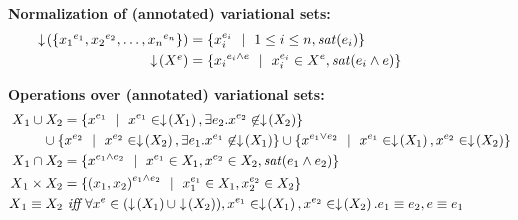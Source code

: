 \begin{figure}
\medskip 
\textbf{Normalization of (annotated) variational sets:}
\begin{alignat*}{1}
\pushIn {\setDef {\annot [\dimMeta_1] {\elem_1}, \annot [\dimMeta_2] {\elem_2}, \ldots,
\annot [\dimMeta_n] {\elem_n}}} &= \setDef {
\annot [\dimMeta_i] \elem_i \myOR 1 \leq i \leq n, \sat {\dimMeta_i}}\\
\pushIn {\annot \vset} &=
\setDef {\annot [\dimMeta_i \wedge \dimMeta] {\elem_i} \myOR 
\annot [\dimMeta_i] \elem_i \in \annot \vset, \sat {\dimMeta_i \wedge \dimMeta}}
\end{alignat*}

\medskip 
\textbf{Operations over (annotated) variational sets:}
\begin{alignat*}{1}
\vset_1 \cup \vset_2 &= \setDef {\annot [\dimMeta_1] \elem \myOR \annot [\dimMeta_1] \elem \in \pushIn {\vset_1}, \exists \dimMeta_2. \annot [\dimMeta_2] \elem \not \in \pushIn{\vset_2}}\\
&\hspace{-15pt} \cup \setDef {\annot [\dimMeta_2] \elem \myOR \annot [\dimMeta_2] \elem \in \pushIn {\vset_2}, 
\exists \dimMeta_1. \annot [\dimMeta_1] \elem  \not \in \pushIn {\vset_1}}
 \cup \setDef {\annot [\dimMeta_1 \vee \dimMeta_2] \elem \myOR 
\annot [\dimMeta_1] \elem \in \pushIn {\vset_1}, \annot [\dimMeta_2] \elem \in \pushIn {\vset_2}}\\
\vset_1 \cap \vset_2 &= \setDef {
\annot [\dimMeta_1 \wedge \dimMeta_2 ]\elem \myOR
\annot [\dimMeta_1] \elem \in \vset_1, \annot [\dimMeta_2] \elem \in \vset_2,
\sat {\dimMeta_1 \wedge \dimMeta_2}}\\
\vset_1 \times \vset_2 &= \setDef{
\annot [\dimMeta_1 \wedge \dimMeta_2] {(\elem_1, \elem_2)} \myOR
\annot [\dimMeta_1] \elem_1 \in \vset_1, \annot [\dimMeta_2] \elem_2 \in \vset_2}\\
\vset_1 \equiv \vset_2 &\textit{ iff }
\forall \annot  \elem \in (\filterSet {\vset_1} \cup \filterSet {\vset_2}),
\annot [\dimMeta_1] \elem \in \filterSet {\vset_1}, \annot [\dimMeta_2] \elem \in \filterSet {\vset_2}.
\dimMeta_1 \equiv \dimMeta_2, \dimMeta \equiv \dimMeta_1
\end{alignat*}


\end{figure}
